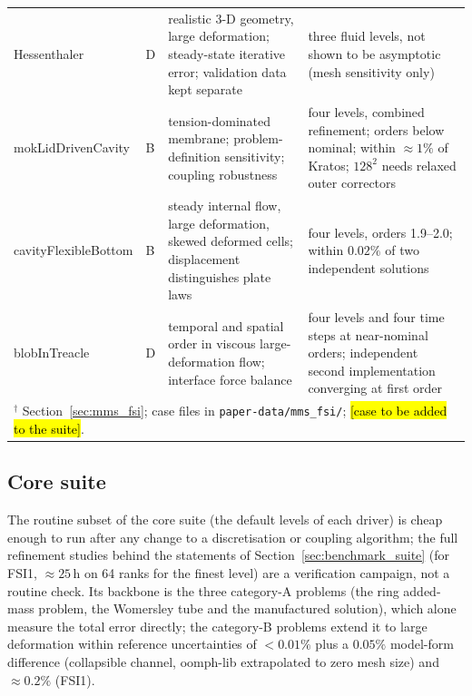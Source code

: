 \begin{table}[htbp]
\begin{tabular}{p{2.8cm}p{1.1cm}p{6.3cm}p{3.4cm}}
		Hessenthaler & D & realistic 3-D geometry, large deformation; steady-state iterative error; validation data kept separate & three fluid levels, not shown to be asymptotic (mesh sensitivity only) \\
		mokLidDrivenCavity & B & tension-dominated membrane; problem-definition sensitivity; coupling robustness & four levels, combined refinement; orders below nominal; within $\approx1\%$ of Kratos; $128^2$ needs relaxed outer correctors \\
		cavityFlexibleBottom & B & steady internal flow, large deformation, skewed deformed cells; displacement distinguishes plate laws & four levels, orders 1.9--2.0; within $0.02\%$ of two independent solutions \\
		blobInTreacle & D & temporal and spatial order in viscous large-deformation flow; interface force balance & four levels and four time steps at near-nominal orders; independent second implementation converging at first order \\
		\bottomrule
		\multicolumn{4}{l}{$^\dagger$ Section~\ref{sec:mms_fsi}; case files in \texttt{paper-data/mms\_fsi/}; \hl{[case to be added to the suite]}.}
	\end{tabular}
\end{table}

\subsection{Core suite}\label{sec:core_suite}

The routine subset of the core suite (the default levels of each driver) is cheap enough to run after any change to a discretisation or coupling algorithm; the full refinement studies behind the statements of Section~\ref{sec:benchmark_suite} (for FSI1, $\approx25$\,h on 64 ranks for the finest level) are a verification campaign, not a routine check.
Its backbone is the three category-A problems (the ring added-mass problem, the Womersley tube and the manufactured solution), which alone measure the total error directly; the category-B problems extend it to large deformation within reference uncertainties of $<0.01\%$ plus a $0.05\%$ model-form difference (collapsible channel, oomph-lib extrapolated to zero mesh size) and $\approx0.2\%$ (FSI1).

